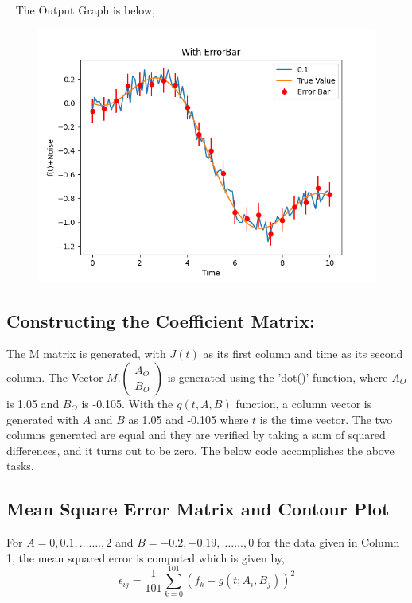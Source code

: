 \documentclass[12pt, a4paper]{report}
\begin{document}
\vspace{5mm} %
\noindent

 \ 
 \break
\noindent
The Output Graph is below,
\begin{figure}[h]
    \centering
    \includegraphics[scale=0.89331799999]{ErrorBar.png} 
    \caption{}
    \label{fig:my_label}
\end{figure}
\subsection{Constructing the Coefficient Matrix:}
The M matrix is generated, with $J(t)$ as its first column and time as its second column. The Vector $M.\left(\begin{array}{cc}
    A_O\\
    B_O 
\end{array}\right)$ is generated using the {\selectfont
'dot()'
} function, where $A_O$ is 1.05 and $B_O$ is -0.105. With the $g(t, A, B)$ function, a column vector is generated with $A$ and $B$ as 1.05 and -0.105 where $t$ is the time vector. The two columns generated are equal and they are verified by taking a sum of squared differences, and it turns out to be zero. The below code accomplishes the above tasks.
 
\vspace{5mm} %
\noindent


\subsection{Mean Square Error Matrix and Contour Plot}
For $A = 0,0.1,…….,2$ and $B = -0.2,-0.19,…….,0$ for the data given in Column 1, the mean squared error is computed which is given by,
\vspace{5mm}
\begin{equation}\label{eq:4}
\epsilon_{ij}=\frac{1}{101}\sum_{k=0}^{101}\left(f_{k}-g(t;A_i,B_j)\right)^{2}
\end{equation}
\end{document}
